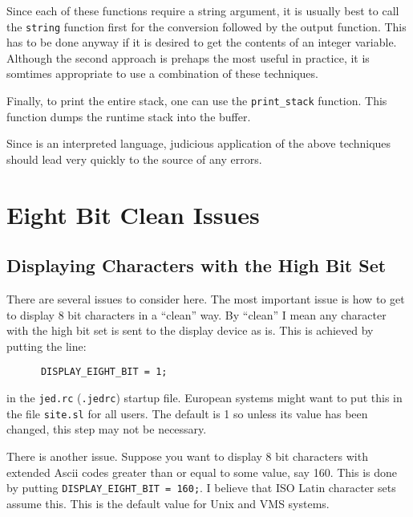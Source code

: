   Since each of these functions require a string argument, it is usually
  best to call the \verb|string| function first for the conversion followed
  by the output function.  This has to be done anyway if it is desired to
  get the contents of an integer variable.  Although the second approach is
  prehaps the most useful in practice, it is somtimes appropriate to use a
  combination of these techniques.

  Finally, to print the entire stack, one can use the \verb|print_stack|
  function.  This function dumps the \slang{} runtime stack into the
   buffer.

  Since \slang{} is an interpreted language, judicious application of the
  above techniques should lead very quickly to the source of any errors.


\section{Eight Bit Clean Issues}


\subsection{Displaying Characters with the High Bit Set}

  There are several issues to consider here. The most important issue is how
  to get \jed{} to display 8 bit characters in a ``clean'' way.  By
  ``clean'' I mean any character with the high bit set is sent to the
  display device as is.  This is achieved by putting the line:

\begin{verbatim}
      DISPLAY_EIGHT_BIT = 1;
\end{verbatim}


  in the \verb|jed.rc| (\verb|.jedrc|) startup file.  European systems might
  want to put this in the file \verb|site.sl| for all users.  The default is
  1 so unless its value has been changed, this step may not be necessary.

  There is another issue. Suppose you want to display 8 bit characters with
  extended Ascii codes greater than or equal to some value, say 160.  This
  is done by putting \verb|DISPLAY_EIGHT_BIT = 160;|.  I believe that ISO
  Latin character sets assume this.  This is the default value for Unix and
  VMS systems.

